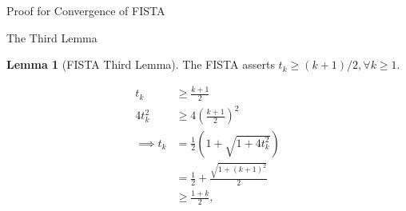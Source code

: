 \documentclass[]{article}
\theoremstyle{definition}
\newtheorem{lemma}{Lemma}[subsection]  %
\begin{document}
\begin{section}{Proof for Convergence of FISTA}
    \begin{subsection}{The Third Lemma}
        \begin{lemma}[FISTA Third Lemma]
            The FISTA asserts $t_k \ge (k + 1)/2, \forall k \ge 1$. 
        \end{lemma}
        \begin{align*}
            t_k 
            &\ge \frac{k + 1}{2}
            \\
            4t_k^2 
            &\ge 4\left(
                \frac{k + 1}{2}
            \right)^2
            \\
            \implies 
            t_k &= \frac{1}{2}\left(
                1 + \sqrt{1 + 4t_k^2}
            \right)
            \\
            &= 
            \frac{1}{2} + \frac{\sqrt{1 + (k + 1)^2}}{2}
            \\
            & \ge \frac{1 + k}{2}, 
        \end{align*}
    \end{subsection}

\end{section}
\end{document}
